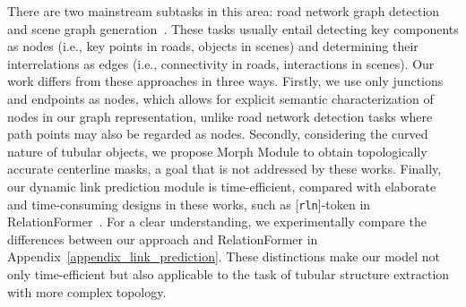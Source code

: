  There are two mainstream subtasks in this area: road network graph detection~\cite{he2020sat2graph, xu2022rngdet, shit2022relationformer, xu2023rngdet++, hetang2024segment} and scene graph generation~\cite{khandelwal2022iterative, kundu2023ggt}. These tasks usually entail detecting key components as nodes (i.e., key points in roads, objects in scenes) and determining their interrelations as edges (i.e., connectivity in roads, interactions in scenes).
Our work differs from these approaches in three ways. 
Firstly, we use only junctions and endpoints as nodes, which allows for explicit semantic characterization of nodes in our graph representation, unlike road network detection tasks where path points may also be regarded as nodes. Secondly, considering the curved nature of tubular objects, we propose Morph Module to obtain topologically accurate centerline masks, a goal that is not addressed by these works. Finally, our dynamic link prediction module is time-efficient, compared with elaborate and time-consuming designs in these works, such as [\texttt{rln}]-token in RelationFormer~\cite{shit2022relationformer}. For a clear understanding, we experimentally compare the differences between our approach and RelationFormer in Appendix~\ref{appendix_link_prediction}. These distinctions make our model not only time-efficient but also applicable to the task of tubular structure extraction with more complex topology.